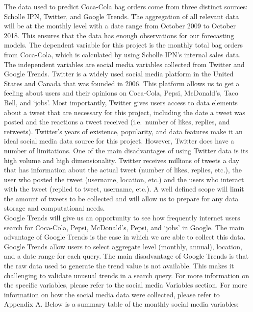 \documentclass[12pt,oneside]{chicagocapstone}
\begin{document}
The data used to predict Coca-Cola bag orders come from three distinct sources: Scholle IPN, Twitter, and Google Trends. The aggregation of all relevant data will be at the monthly level with a date range from October 2009 to October 2018. This ensures that the data has enough observations for our forecasting models. The dependent variable for this project is the monthly total bag orders from Coca-Cola, which is calculated by using Scholle IPN's internal sales data. The independent variables are social media variables collected from Twitter and Google Trends.
Twitter is a widely used social media platform in the United States and Canada that was founded in 2006. This platform allows us to get a feeling about users and their opinions on Coca-Cola, Pepsi, McDonald's, Taco Bell, and `jobs'. Most importantly, Twitter gives users access to data elements about a tweet that are necessary for this project, including the date a tweet was posted and the reactions a tweet received (i.e.~number of likes, replies, and retweets). Twitter's years of existence, popularity, and data features make it an ideal social media data source for this project. However, Twitter does have a number of limitations. One of the main disadvantages of using Twitter data is its high volume and high dimensionality. Twitter receives millions of tweets a day that has information about the actual tweet (number of likes, replies, etc.), the user who posted the tweet (username, location, etc.) and the users who interact with the tweet (replied to tweet, username, etc.). A well defined scope will limit the amount of tweets to be collected and will allow us to prepare for any data storage and computational needs.\\
Google Trends will give us an opportunity to see how frequently internet users search for Coca-Cola, Pepsi, McDonald's, Pepsi, and `jobs' in Google. The main advantage of Google Trends is the ease in which we are able to collect this data. Google Trends allow users to select aggregate level (monthly, annual), location, and a date range for each query. The main disadvantage of Google Trends is that the raw data used to generate the trend value is not available. This makes it challenging to validate unusual trends in a search query. For more information on the specific variables, please refer to the social media Variables section. For more information on how the social media data were collected, please refer to Appendix A. Below is a summary table of the monthly social media variables:
\end{document}
